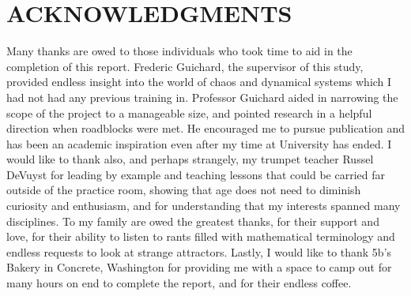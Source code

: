\documentclass[letterpaper, 10 pt, conference]{ieeeconf}  %
\begin{document}
\section{ACKNOWLEDGMENTS}
		Many thanks are owed to those individuals who took time to aid in the completion of this report. Frederic Guichard, the supervisor of this study, provided endless insight into the world of chaos and dynamical systems which I had not had any previous training in. Professor Guichard aided in narrowing the scope of the project to a manageable size, and pointed research in a helpful direction when roadblocks were met. He encouraged me to pursue publication and has been an academic inspiration even after my time at University has ended. I would like to thank also, and perhaps strangely, my trumpet teacher Russel DeVuyst for leading by example and teaching lessons that could be carried far outside of the practice room, showing that age does not need to diminish curiosity and enthusiasm, and for understanding that my interests spanned many disciplines. To my family are owed the greatest thanks, for their support and love, for their ability to listen to rants filled with mathematical terminology and endless requests to look at strange attractors. Lastly, I would like to thank 5b's Bakery in Concrete, Washington for providing me with a space to camp out for many hours on end to complete the report, and for their endless coffee. 
\end{document}
